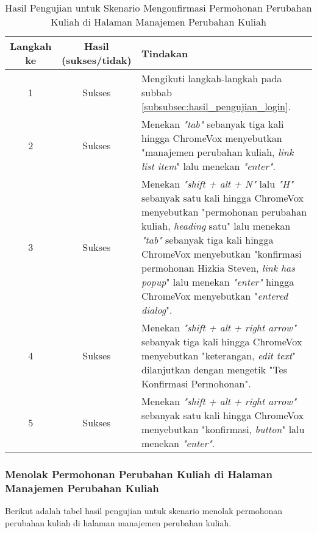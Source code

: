 \begin{table}[H]
    \centering 
    \caption{Hasil Pengujian untuk Skenario Mengonfirmasi Permohonan Perubahan Kuliah di Halaman Manajemen Perubahan Kuliah}
    \label{tab:hasil_pengujian_mengonfirmasi_permohonan_perubahan_kuliah_di_halaman_manajemen_perubahan_kuliah}
    \begin{tabular}{|c|c|p{10cm}|}
        \toprule
        Langkah ke & Hasil (sukses/tidak) & Tindakan \\

        \midrule
        1 & Sukses & Mengikuti langkah-langkah pada subbab \ref{subsubsec:hasil_pengujian_login}. \\
        2 & Sukses & Menekan \textit{"tab"} sebanyak tiga kali hingga ChromeVox menyebutkan "manajemen perubahan kuliah, \textit{link list item}" lalu menekan \textit{"enter"}. \\
        3 & Sukses & Menekan \textit{"shift + alt + N"} lalu \textit{"H"} sebanyak satu kali hingga ChromeVox menyebutkan "permohonan perubahan kuliah, \textit{heading} satu" lalu menekan \textit{"tab"} sebanyak tiga kali hingga ChromeVox menyebutkan "konfirmasi permohonan Hizkia Steven, \textit{link has popup}" lalu menekan \textit{"enter"} hingga ChromeVox menyebutkan "\textit{entered dialog}". \\
        4 & Sukses & Menekan \textit{"shift + alt + right arrow"} sebanyak tiga kali hingga ChromeVox menyebutkan "keterangan, \textit{edit text}" dilanjutkan dengan mengetik "Tes Konfirmasi Permohonan". \\
        5 & Sukses & Menekan \textit{"shift + alt + right arrow"} sebanyak satu kali hingga ChromeVox menyebutkan "konfirmasi, \textit{button}" lalu menekan \textit{"enter"}. \\ 

        \bottomrule

    \end{tabular}
\end{table}

\subsubsection{Menolak Permohonan Perubahan Kuliah di Halaman Manajemen Perubahan Kuliah}
\label{subsubsec:hasil_pengujian_menolak_permohonan_perubahan_kuliah_di_halaman_manajemen_perubahan_kuliah}
Berikut adalah tabel hasil pengujian untuk skenario menolak permohonan perubahan kuliah di halaman manajemen perubahan kuliah.

